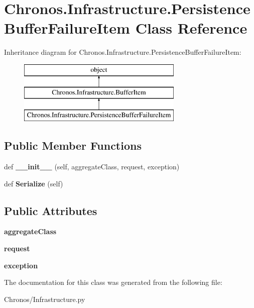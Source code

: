 \hypertarget{classChronos_1_1Infrastructure_1_1PersistenceBufferFailureItem}{}\section{Chronos.\+Infrastructure.\+Persistence\+Buffer\+Failure\+Item Class Reference}
\label{classChronos_1_1Infrastructure_1_1PersistenceBufferFailureItem}
Inheritance diagram for Chronos.\+Infrastructure.\+Persistence\+Buffer\+Failure\+Item\+:\begin{figure}[H]
\begin{center}
\leavevmode
\includegraphics[height=3.000000cm]{classChronos_1_1Infrastructure_1_1PersistenceBufferFailureItem}
\end{center}
\end{figure}
\subsection*{Public Member Functions}
\begin{DoxyCompactItemize}
\item 
def {\bfseries \+\_\+\+\_\+init\+\_\+\+\_\+} (self, aggregate\+Class, request, exception)
\item 
def {\bfseries Serialize} (self)
\end{DoxyCompactItemize}
\subsection*{Public Attributes}
\begin{DoxyCompactItemize}
\item 
{\bfseries aggregate\+Class}
\item 
{\bfseries request}
\item 
{\bfseries exception}
\end{DoxyCompactItemize}


The documentation for this class was generated from the following file\+:\begin{DoxyCompactItemize}
\item 
Chronos/Infrastructure.\+py\end{DoxyCompactItemize}
